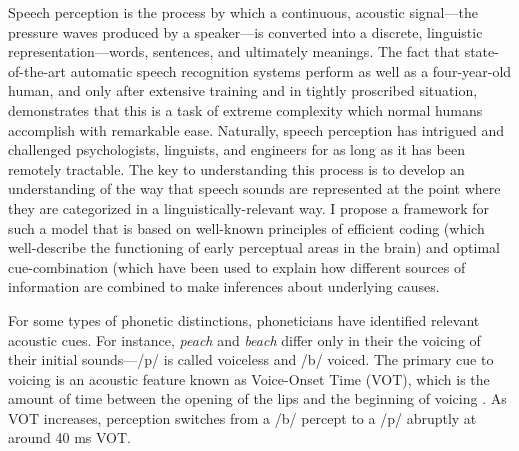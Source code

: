 \documentclass[12pt]{article}
\begin{document}
Speech perception is the process by which a continuous, acoustic signal---the pressure waves produced by a speaker---is converted into a discrete, linguistic representation---words, sentences, and ultimately meanings.  The fact that state-of-the-art automatic speech recognition systems perform as well as a four-year-old human, and only after extensive training and in tightly proscribed situation, demonstrates that this is a task of extreme complexity which normal humans accomplish with remarkable ease.  Naturally, speech perception has intrigued and challenged psychologists, linguists, and engineers for as long as it has been remotely tractable.  The key to understanding this process is to develop an understanding of the way that speech sounds are represented at the point where they are categorized in a linguistically-relevant way.  I propose a framework for such a model that is based on well-known principles of efficient coding (which well-describe the functioning of early perceptual areas in the brain) and optimal cue-combination (which have been used to explain how different sources of information are combined to make inferences about underlying causes.


For some types of phonetic distinctions, phoneticians have identified relevant acoustic cues.  For instance, \emph{peach} and \emph{beach} differ only in their the voicing of their initial sounds---/p/ is called voiceless and /b/ voiced.  The primary cue to voicing is an acoustic feature known as Voice-Onset Time (VOT), which is the amount of time between the opening of the lips 
and the beginning of voicing
.  As VOT increases, perception switches from a /b/ percept to a /p/ abruptly at around 40 ms VOT.
\end{document}
